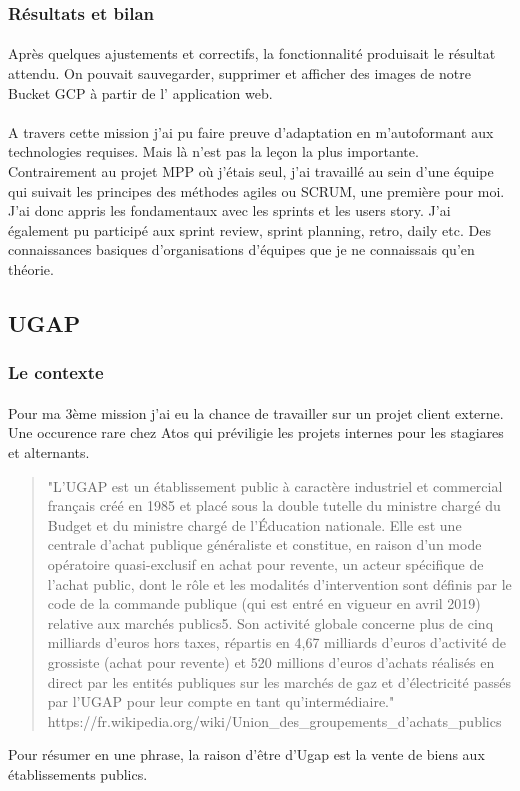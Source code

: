 \documentclass[12pt]{article}
\begin{document}
\begin {sloppypar}
\subsubsection{Résultats et bilan}
\paragraph{}
Après quelques ajustements et correctifs, la fonctionnalité produisait le résultat attendu. On 
pouvait sauvegarder, supprimer et afficher des images de notre Bucket GCP à partir de l'
application web. 
\paragraph{}
A travers cette mission j'ai pu faire preuve d'adaptation en m'autoformant aux technologies 
requises. Mais là n'est pas la leçon la plus importante. Contrairement au projet MPP où j'étais 
seul, j'ai travaillé au sein d'une équipe qui suivait les principes des méthodes agiles ou SCRUM,
une première pour moi. J'ai donc appris les fondamentaux avec les sprints et les users story. 
J'ai également pu participé aux sprint review, sprint planning, retro, daily etc. Des connaissances 
basiques d'organisations d'équipes que je ne connaissais qu'en théorie.

\newpage
\subsection{UGAP}
\subsubsection{Le contexte}
\paragraph{}
Pour ma 3ème mission j'ai eu la chance de travailler sur un projet client externe. Une occurence 
rare chez Atos qui préviligie les projets internes pour les stagiares et alternants.
\begin{quote}
  "L’UGAP est un établissement public à caractère industriel et commercial français créé en 
  1985 et placé sous la double tutelle du ministre chargé du Budget et du ministre chargé de 
  l'Éducation nationale. Elle est une centrale d'achat publique généraliste et constitue, 
  en raison d'un mode opératoire quasi-exclusif en achat pour revente, un acteur spécifique de 
  l’achat public, dont le rôle et les modalités d’intervention sont définis par le code de 
  la commande publique (qui est entré en vigueur en avril 2019) relative aux marchés publics5. 
  Son activité globale concerne plus de cinq milliards d'euros hors taxes, 
  répartis en 4,67 milliards d'euros d'activité de grossiste (achat pour revente) et 520 millions d'euros 
  d'achats réalisés en direct par les entités publiques sur les marchés de gaz et d'électricité passés par 
  l'UGAP pour leur compte en tant qu'intermédiaire." \linebreak 
  https://fr.wikipedia.org/wiki/Union\_des\_groupements\_d'achats\_publics 
\end{quote}
Pour résumer en une phrase, la raison d'être d'Ugap est la vente de biens aux établissements publics.

\end{sloppypar}
\end{document}
